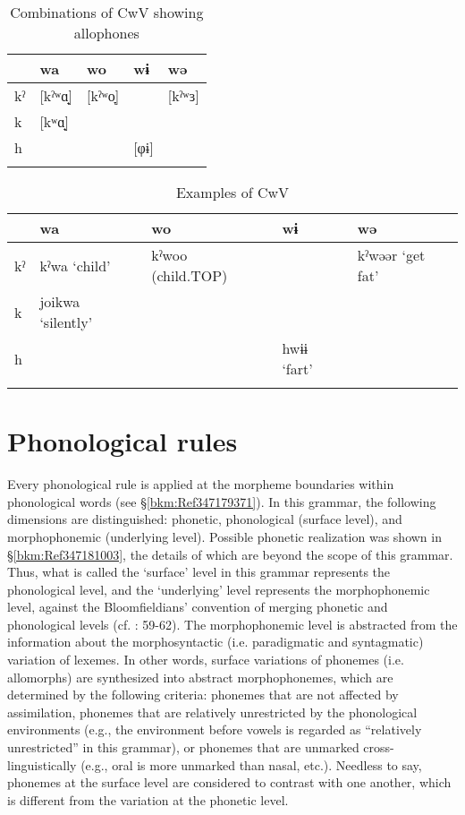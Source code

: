 \begin{table}
\caption{Combinations of CwV showing allophones\label{bkm:Ref365009143}}
\begin{tabularx}{\textwidth}{lQQQQ}
\lsptoprule
   & wa &  wo &  wɨ & wə\\\midrule
kˀ &  [kˀʷɑ̟] & [kˀʷo̞]   & & [kˀʷɜ]\\
k  &  [kʷɑ̟]      \\
h  &          &      & [φɨ]  \\
\lspbottomrule
\end{tabularx}
\end{table}


\begin{table}
\caption{Examples of CwV}
\begin{tabularx}{\textwidth}{lllQl}
\lsptoprule
& {wa}    & {wo}   & {wɨ}   & {wə}  \\\midrule
{kˀ} & {kˀwa}  {‘child’} & {kˀwoo}  {(child.TOP)}  &    & {kˀwəər}  {‘get fat’}\\
{k} & {joikwa}  {‘silently’}            \\
{h}  &                       &                        & {hwɨɨ}  {‘fart’}    \\
\lspbottomrule
\end{tabularx}
\end{table}

\section{Phonological rules}
\hypertarget{RefHeadingToc395696977}{}\label{bkm:Ref302723494}
Every phonological rule is applied at the morpheme boundaries within phonological words (see §\ref{bkm:Ref347179371}). In this grammar, the following dimensions are distinguished: phonetic, phonological (surface level), and morphophonemic (underlying level). Possible phonetic realization was shown in §\ref{bkm:Ref347181003}, the details of which are beyond the scope of this grammar. Thus, what is called the ‘surface’ level in this grammar represents the phonological level, and the ‘underlying’ level represents the morphophonemic level, against the Bloomfieldians’ convention of merging phonetic and phonological levels (cf. \citealt{Lass1984}: 59-62). The morphophonemic level is abstracted from the information about the morphosyntactic (i.e. paradigmatic and syntagmatic) variation of lexemes. In other words, surface variations of phonemes (i.e. allomorphs) are synthesized into abstract morphophonemes, which are determined by the following criteria:  phonemes that are not affected by assimilation,  phonemes that are relatively unrestricted by the phonological environments (e.g., the environment before vowels is regarded as “relatively unrestricted” in this grammar), or  phonemes that are unmarked cross-linguistically (e.g., oral is more unmarked than nasal, etc.). Needless to say, phonemes at the surface level are considered to contrast with one another, which is different from the variation at the phonetic level.

